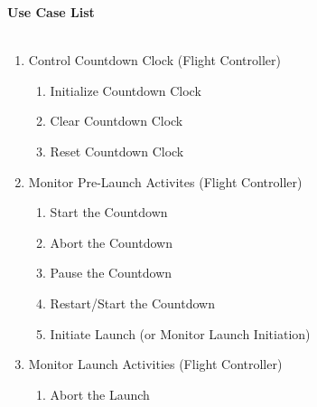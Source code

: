 \documentclass[letterpaper]{article}
\begin{document}
\noindent
\textbf{Use Case List}\\\\
\begin{enumerate}
\item Control Countdown Clock (Flight Controller)
\begin{enumerate}
\item Initialize Countdown Clock
\item Clear Countdown Clock
\item Reset Countdown Clock
\end{enumerate}
\item Monitor Pre-Launch Activites (Flight Controller)
\begin{enumerate}
\item Start the Countdown
\item Abort the Countdown
\item Pause the Countdown
\item Restart/Start the Countdown
\item Initiate Launch (or Monitor Launch Initiation)
\end{enumerate}
\item Monitor Launch Activities (Flight Controller)
\begin{enumerate}
\item Abort the Launch
\end{enumerate}
\end{enumerate}
\end{document}

